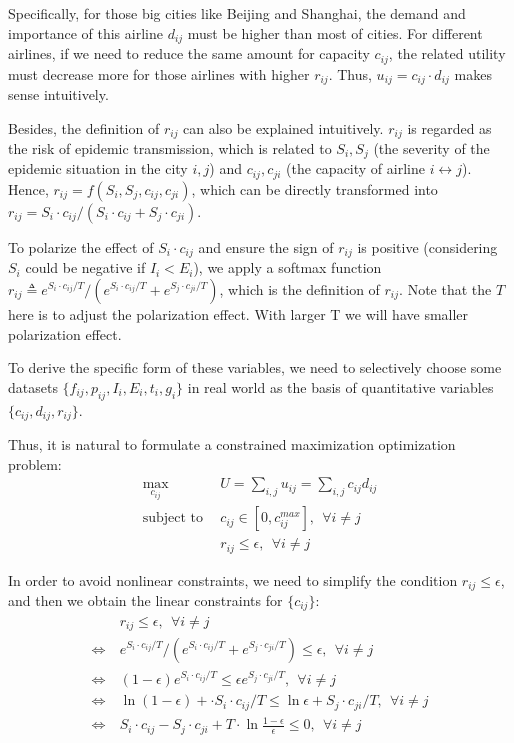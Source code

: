 \documentclass[11pt,twocolumn]{article}
\begin{document}
Specifically, for those big cities like Beijing and Shanghai, the demand and importance of this airline $d_{ij}$ must be higher than most of cities. For different airlines, if we need to reduce the same amount for capacity $c_{ij}$, the related utility must decrease more for those airlines with higher $r_{ij}$. Thus, $u_{ij} = c_{ij} \cdot d_{ij}$ makes sense intuitively. 

Besides, the definition of $r_{ij}$ can also be explained intuitively. $r_{ij}$ is regarded as the risk of epidemic transmission, which is related to $S_i,S_j$ (the severity of the epidemic situation in the city $i,j$) and $c_{ij},c_{ji}$ (the capacity of airline $i \leftrightarrow j$). Hence, $r_{ij} = f(S_i, S_j, c_{ij}, c_{ji})$, which can be directly transformed into $r_{ij} = S_i \cdot c_{ij} / (S_i \cdot c_{ij} + S_j \cdot c_{ji})$.

To polarize the effect of $S_i \cdot c_{ij}$ and ensure the sign of $r_{ij}$ is positive (considering $S_i$ could be negative if $I_i < E_i$), we apply a softmax function $r_{ij} \triangleq e^{S_i \cdot c_{ij} / T} / (e^{S_i \cdot c_{ij} / T} + e^{S_j \cdot c_{ji} / T})$, which is the definition of $r_{ij}$. Note that the $T$ here is to adjust the polarization effect. With larger T we will have smaller polarization effect.

To derive the specific form of these variables, we need to selectively choose some datasets $\{ f_{ij},p_{ij}, I_i, E_i, t_i, g_i \}$ in real world as the basis of quantitative variables $\{ c_{ij},d_{ij}, r_{ij} \}$. 

Thus, it is natural to formulate a constrained maximization optimization problem:
\begin{align*}
    \max_{c_{ij}}~& U = \sum_{i,j} u_{ij} = \sum_{i,j} c_{ij}d_{ij}\\
    \text{subject to}~~& c_{ij} \in [0, c_{ij}^{max}],~~ \forall i \neq j \\
    & r_{ij} \le \epsilon,~~ \forall i \neq j 
\end{align*}

In order to avoid nonlinear constraints, we need to simplify the condition $r_{ij} \le \epsilon$, and then we obtain the linear constraints for $\{c_{ij}\}$:
\begin{equation*}
    \begin{aligned}
     & r_{ij} \le \epsilon,~~ \forall i \neq j \\
     \Leftrightarrow~& e^{S_i \cdot c_{ij} / T} / (e^{S_i \cdot c_{ij} / T} + e^{S_j \cdot c_{ji} / T}) \le \epsilon,~~ \forall i \neq j \\
     \Leftrightarrow~& (1-\epsilon) e^{S_i \cdot c_{ij} / T} \le \epsilon e^{S_j \cdot c_{ji} / T},~~ \forall i \neq j \\
     \Leftrightarrow~& \ln{(1-\epsilon)} + \cdot S_i \cdot c_{ij} / T \le \ln{\epsilon} + S_j \cdot c_{ji} / T,~~ \forall i \neq j \\
     \Leftrightarrow~& S_i \cdot c_{ij} - S_j \cdot c_{ji} + T \cdot \ln{\frac{1-\epsilon}{\epsilon}} \le 0,~~ \forall i \neq j
    \end{aligned}
\end{equation*}
\end{document}
